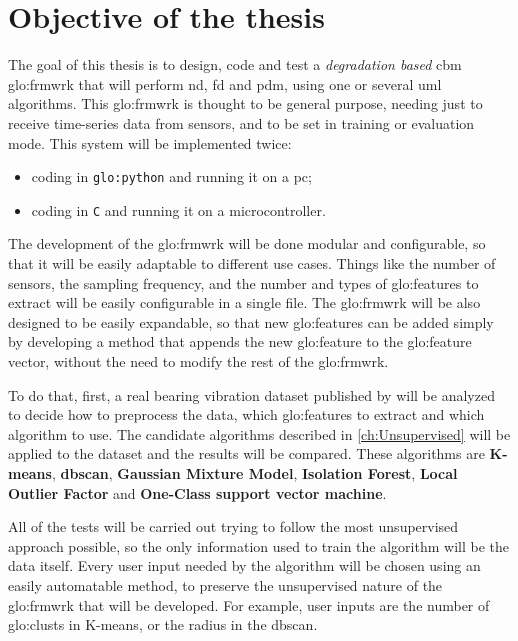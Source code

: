 \section{Objective of the thesis}
\label{sec:objectives}

The goal of this thesis is to design, code and test a \emph{degradation based} \gls{cbm} \gls{glo:frmwrk} that will perform \gls{nd}, \gls{fd} and \gls{pdm}, using one or several \gls{uml} algorithms. This \gls{glo:frmwrk} is thought to be general purpose, needing just to receive time-series data from sensors, and to be set in training or evaluation mode.
This system will be implemented twice:
\begin{itemize}
    \item  coding in \texttt{\gls{glo:python}} and running it on a \gls{pc};
    \item   coding in \texttt{C} and running it on a microcontroller.
\end{itemize}

The development of the \gls{glo:frmwrk} will be done modular and configurable, so that it will be easily adaptable to different use cases. Things like the number of sensors, the sampling frequency, and the number and types of \gls{glo:feature}s to extract will be easily configurable in a single file. The \gls{glo:frmwrk} will be also designed to be easily expandable, so that new \gls{glo:feature}s can be added simply by developing a method that appends the new \gls{glo:feature} to the \gls{glo:feature} vector, without the need to modify the rest of the \gls{glo:frmwrk}.

To do that, first, a real bearing vibration dataset published by \cite{IMSpaper} will be analyzed to decide how to preprocess the data, which \gls{glo:feature}s to extract and which algorithm to use. 
The candidate algorithms described in \autoref{ch:Unsupervised} will be applied to the dataset and the results will be compared. These algorithms are \textbf{K-means}, \textbf{\gls{dbscan}}, \textbf{Gaussian Mixture Model}, \textbf{Isolation Forest}, \textbf{Local Outlier Factor} and \textbf{One-Class support vector machine}. 

All of the tests will be carried out trying to follow the most unsupervised approach possible, so the only information used to train the algorithm will be the data itself. Every user input needed by the algorithm will be chosen using an easily automatable method, to preserve the unsupervised nature of the \gls{glo:frmwrk} that will be developed. For example, user inputs are the number of \gls{glo:clust}s in K-means, or the radius in the \gls{dbscan}.

